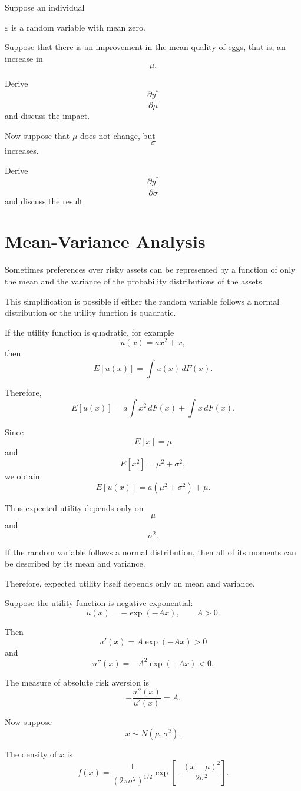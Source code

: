 Suppose an individual


\(\varepsilon\) is a random variable with mean zero.

Suppose that there is an improvement in the mean quality of eggs, that is, an increase in
\[
\mu.
\]

Derive
\[
\frac{\partial y^*}{\partial \mu}
\]
and discuss the impact.

Now suppose that \(\mu\) does not change, but
\[
\sigma
\]
increases.

Derive
\[
\frac{\partial y^*}{\partial \sigma}
\]
and discuss the result.

\section{Mean-Variance Analysis}

Sometimes preferences over risky assets can be represented by a function of only the mean and the variance of the probability distributions of the assets.

This simplification is possible if either the random variable follows a normal distribution or the utility function is quadratic.

If the utility function is quadratic, for example
\[
u(x)=ax^2+x,
\]
then
\[
E[u(x)]
=
\int u(x)\,dF(x).
\]

Therefore,
\[
E[u(x)]
=
a\int x^2\,dF(x)
+
\int x\,dF(x).
\]

Since
\[
E[x]=\mu
\]
and
\[
E[x^2]=\mu^2+\sigma^2,
\]
we obtain
\[
E[u(x)]
=
a(\mu^2+\sigma^2)+\mu.
\]

Thus expected utility depends only on
\[
\mu
\]
and
\[
\sigma^2.
\]

If the random variable follows a normal distribution, then all of its moments can be described by its mean and variance.

Therefore, expected utility itself depends only on mean and variance.

Suppose the utility function is negative exponential:
\[
u(x)=-\exp(-Ax),
\qquad
A>0.
\]

Then
\[
u'(x)=A\exp(-Ax)>0
\]
and
\[
u''(x)=-A^2\exp(-Ax)<0.
\]

The measure of absolute risk aversion is
\[
-\frac{u''(x)}{u'(x)}=A.
\]

Now suppose
\[
x\sim N(\mu,\sigma^2).
\]

The density of \(x\) is
\[
f(x)
=
\frac{1}{(2\pi\sigma^2)^{1/2}}
\exp\left[
-\frac{(x-\mu)^2}{2\sigma^2}
\right].
\]

